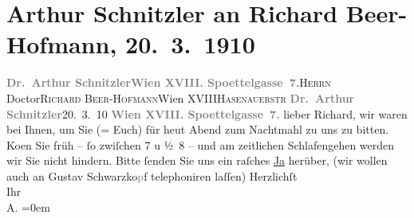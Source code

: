 

               \section[Arthur Schnitzler an Richard Beer-Hofmann, 20. 3. 1910]{ Arthur Schnitzler an Richard Beer-Hofmann, 20. 3. 1910}\nopagebreak{}\rehead{ }\begin{ledgroupsized}[t]{13cm}\normalsize\beginnumbering{} \toendnotes[C]{\smallbreak\pagebreak[2]} 
\toendnotes[C]{\smallbreak}\pstart{}{\pb}\textcolor{gray}{\textbf{Dr. Arthur Schnitzler}}\pend{}\pstart{}\textcolor{gray}{\textbf{Wien XVIII. Spoettelgasse 7.}}\pend{}{\bigskip}\pstart{}{\pb}\textsc{Herrn} Doctor\pend{}\pstart{}\textsc{Richard Beer-Hofmann}\pend{}\pstart{}Wien XVIII\pend{}\pstart{}\textsc{Hasenauerstr}\pend{}{\bigskip}\pstart
           \noindent{}{\pb}\textcolor{gray}{\textbf{Dr. Arthur Schnitzler}}\hfill 20. 3. 10\pend
           \pstart
           \textcolor{gray}{\textbf{Wien XVIII. Spoettelgasse 7.}}\pend
           \pstart{}lieber Richard, \pend\pstart
           wir waren bei Ihnen, um Sie \introOben{}(= Euch)\introOben{} für heut Abend zum Nachtmahl zu uns zu
               bitten.\pend
           \pstart
           Ko{\geminationm}en Sie früh – ſo zwiſchen 7 u
                  ½ 8 – und {\pb}am zeitlichen Schlafengehen
               werden wir Sie nicht hindern.\pend
           \pstart
           Bitte ſenden Sie uns ein raſches \uline{Ja} herüber, (wir
               wollen auch {\pb}an Gustav
                     Schwarzko\textcolor{gray}{p}f telephoniren laſſen)\pend
           \pstart
           Herzlichſt{\\[\baselineskip]}Ihr{\\[\baselineskip]}\spacefill\mbox{A.}\pend
           \leftskip=0em{}          \endnumbering{}\end{ledgroupsized}  \newcommand{\dateiname}{L01918}\newcommand{\titel}{Arthur Schnitzler an Richard Beer-Hofmann, 20. 3. 1910}\newcommand{\editorInnen}{Martin Anton Müller und Gerd-Hermann Susen}
      